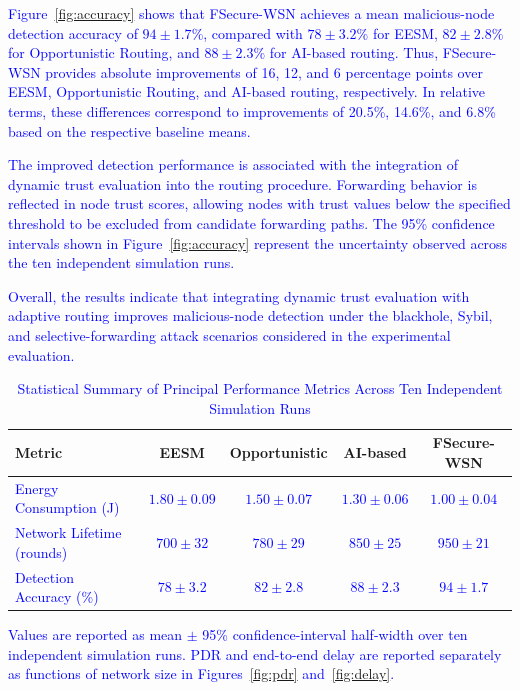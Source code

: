 \documentclass[pdflatex,sn-mathphys-num]{sn-jnl}
\begin{document}
\textcolor{blue}{Figure~\ref{fig:accuracy} shows that FSecure-WSN achieves a
mean malicious-node detection accuracy of $94\pm1.7\%$, compared with
$78\pm3.2\%$ for EESM, $82\pm2.8\%$ for Opportunistic Routing, and
$88\pm2.3\%$ for AI-based routing. Thus, FSecure-WSN provides absolute
improvements of 16, 12, and 6 percentage points over EESM, Opportunistic
Routing, and AI-based routing, respectively. In relative terms, these
differences correspond to improvements of 20.5\%, 14.6\%, and 6.8\% based
on the respective baseline means.}

\textcolor{blue}{The improved detection performance is associated with the
integration of dynamic trust evaluation into the routing procedure.
Forwarding behavior is reflected in node trust scores, allowing nodes with
trust values below the specified threshold to be excluded from candidate
forwarding paths. The 95\% confidence intervals shown in
Figure~\ref{fig:accuracy} represent the uncertainty observed across the ten
independent simulation runs.}

\textcolor{blue}{Overall, the results indicate that integrating dynamic
trust evaluation with adaptive routing improves malicious-node detection
under the blackhole, Sybil, and selective-forwarding attack scenarios
considered in the experimental evaluation.}



\begin{table}[ht]
\centering
\tiny
\caption{\textcolor{blue}{Statistical Summary of Principal Performance
Metrics Across Ten Independent Simulation Runs}}
\label{tab:statistical_results}
\begin{tabular}{lcccc}
\toprule
\textbf{Metric} &
\textbf{EESM} &
\textbf{Opportunistic} &
\textbf{AI-based} &
\textbf{FSecure-WSN} \\
\midrule

\textcolor{blue}{Energy Consumption (J)}
& \textcolor{blue}{$1.80 \pm 0.09$}
& \textcolor{blue}{$1.50 \pm 0.07$}
& \textcolor{blue}{$1.30 \pm 0.06$}
& \textcolor{blue}{$1.00 \pm 0.04$} \\

\textcolor{blue}{Network Lifetime (rounds)}
& \textcolor{blue}{$700 \pm 32$}
& \textcolor{blue}{$780 \pm 29$}
& \textcolor{blue}{$850 \pm 25$}
& \textcolor{blue}{$950 \pm 21$} \\

\textcolor{blue}{Detection Accuracy (\%)}
& \textcolor{blue}{$78 \pm 3.2$}
& \textcolor{blue}{$82 \pm 2.8$}
& \textcolor{blue}{$88 \pm 2.3$}
& \textcolor{blue}{$94 \pm 1.7$} \\

\bottomrule
\end{tabular}

\textcolor{blue}{\footnotesize Values are reported as mean $\pm$ 95\%
confidence-interval half-width over ten independent simulation runs. PDR
and end-to-end delay are reported separately as functions of network size
in Figures~\ref{fig:pdr} and~\ref{fig:delay}.}
\end{table}
\end{document}
